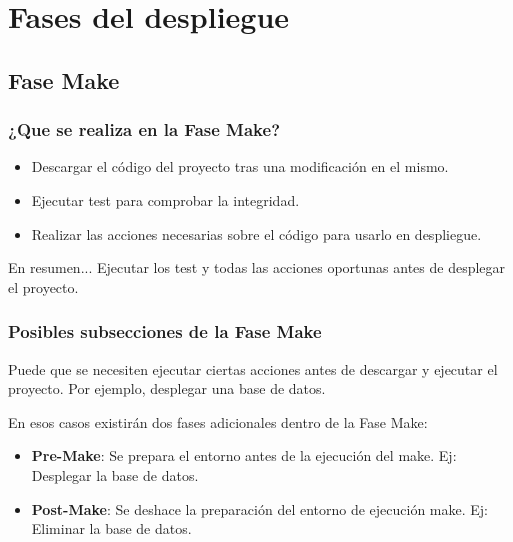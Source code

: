 \documentclass[
xcolor={svgnames},
hyperref={colorlinks,citecolor=DeepPink4,linkcolor=Black,urlcolor=DarkBlue}
]{beamer}
\begin{document}
\section{Fases del despliegue}


\subsection{Fase Make}

\begin{frame}
	\frametitle{¿Que se realiza en la Fase Make?}
	\begin{itemize}
		\item Descargar el código del proyecto tras una modificación en el mismo.
		\item Ejecutar test para comprobar la integridad.
		\item Realizar las acciones necesarias sobre el código para usarlo en despliegue.
	\end{itemize}
	\vspace{0.2in}
	\begin{block}{En resumen...}
		Ejecutar los test y todas las acciones oportunas antes de desplegar el proyecto.
	\end{block} 
\end{frame}

\begin{frame}
	\frametitle{Posibles subsecciones de la Fase Make}
	Puede que se necesiten ejecutar ciertas acciones antes de descargar y ejecutar el proyecto. Por ejemplo, desplegar una base de datos.
\vspace{0.2in}	

	En esos casos existirán dos fases adicionales dentro de la Fase Make:
	
	\begin{itemize}
		\item \textbf{Pre-Make}: Se prepara el entorno antes de la ejecución del make. Ej: Desplegar la base de datos.
		\item \textbf{Post-Make}: Se deshace la preparación del entorno de ejecución make. Ej: Eliminar la base de datos.
	\end{itemize}
\end{frame}
\end{document}
